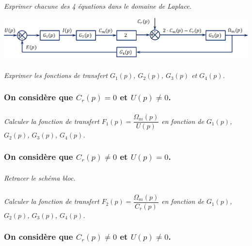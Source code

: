 \documentclass[10pt]{article}
\newif\ifprof
\begin{document}
\subparagraph{}
\textit{Exprimer chacune des 4 équations dans le domaine de Laplace.}
\ifprof
\begin{corrige}
\end{corrige}
\else
\fi

\begin{center}
\includegraphics[width=.9\textwidth]{images/SchemaBloc_01}
\end{center}

\subparagraph{}
\textit{Exprimer les fonctions de transfert $G_1(p)$, $G_2(p)$, $G_3(p)$ et $G_4(p)$.}
\ifprof
\begin{corrige}
\end{corrige}
\else
\fi


\subsubsection*{On considère que $C_r (p)=0$ et $U(p)\neq 0$.}

\subparagraph{}\textit{Calculer la fonction de transfert $F_1 (p)=\dfrac{\Omega_m (p)}{U(p)}$ en fonction de $G_1(p)$, $G_2(p)$, $G_3(p)$, $G_4 (p)$.}
\ifprof
\begin{corrige}
\end{corrige}
\else
\fi

\subsubsection*{On considère que $C_r (p)\neq0$ et $U(p)=0$.}
\subparagraph{}
\textit{Retracer le schéma bloc.}
\ifprof
\begin{corrige}
\end{corrige}
\else
\fi

\subparagraph{}
\textit{Calculer la fonction de transfert $F_2 (p)=\dfrac{\Omega_m (p)}{C_r (p)}$ en fonction de $G_1(p)$, $G_2(p)$, $G_3(p)$, $G_4 (p)$.}

\ifprof
\begin{corrige}
\end{corrige}
\else
\fi

\subsubsection*{On considère que $C_r (p)\neq0$ et $U(p)\neq0$.}
\end{document}
